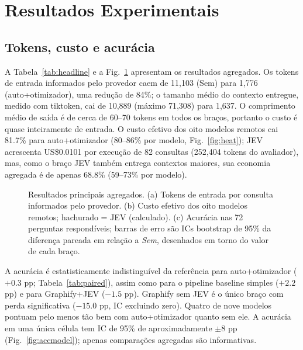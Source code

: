 \documentclass[conference,onecolumn,11pt]{IEEEtran}
\begin{document}
\FloatBarrier
\section{Resultados Experimentais}\label{sec:results}
\subsection{Tokens, custo e acurácia}
A Tabela~\ref{tab:headline} e a Fig.~\ref{fig:headline} apresentam os resultados agregados. Os tokens de entrada informados pelo provedor caem de 11,103 (Sem) para 1,776 (auto+otimizador), uma redução de 84\%; o tamanho médio do contexto entregue, medido com tiktoken, cai de 10,889 (máximo 71,308) para 1,637. O comprimento médio de saída é de cerca de 60--70 tokens em todos os braços, portanto o custo é quase inteiramente de entrada. O custo efetivo dos oito modelos remotos cai 81.7\% para auto+otimizador (80--86\% por modelo, Fig.~\ref{fig:heat}); JEV acrescenta US\$0.0101 por execução de 82 consultas (252,404 tokens do avaliador), mas, como o braço JEV também entrega contextos maiores, sua economia agregada é de apenas 68.8\% (59--73\% por modelo).




\begin{figure}[!htbp]\centering
{}
\caption{Resultados principais agregados. (a) Tokens de entrada por consulta informados pelo provedor. (b) Custo efetivo dos oito modelos remotos; hachurado = JEV (calculado). (c) Acurácia nas 72 perguntas respondíveis; barras de erro são ICs bootstrap de 95\% da diferença pareada em relação a \emph{Sem}, desenhados em torno do valor de cada braço.}\label{fig:headline}
\end{figure}

A acurácia é estatisticamente indistinguível da referência para auto+otimizador ($+0.3$ pp; Tabela~\ref{tab:paired}), assim como para o pipeline baseline simples ($+2.2$ pp) e para Graphify+JEV ($-1.5$ pp). Graphify sem JEV é o único braço com perda significativa ($-15.0$ pp, IC excluindo zero). Quatro de nove modelos pontuam pelo menos tão bem com auto+otimizador quanto sem ele. A acurácia em uma única célula tem IC de 95\% de aproximadamente $\pm 8$ pp (Fig.~\ref{fig:accmodel}); apenas comparações agregadas são informativas.


\end{document}
